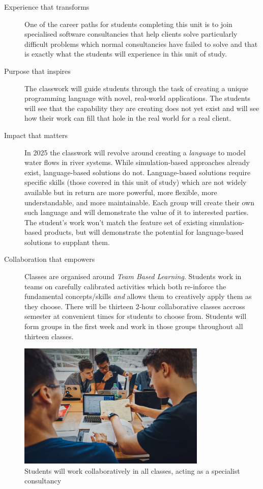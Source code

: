 \documentclass[twoside=false,DIV=14]{scrartcl}
\begin{document}
\begin{description}
\item[Experience that transforms] One of the career paths for students completing this unit is to join specialised software consultancies that help clients solve particularly difficult problems which normal consultancies have failed to solve and that is exactly what the students will experience in this unit of study.
\item[Purpose that inspires] The classwork will guide students through the task of creating a unique programming language with novel, real-world applications.  The students will see that the capability they are creating does not yet exist and will see how their work can fill that hole in the real world for a real client.  
\item[Impact that matters] In 2025 the classwork will revolve around creating a \emph{language} to model water flows in river systems.  While simulation-based approaches already exist, language-based solutions do not.  Language-based solutions require specific skills (those covered in this unit of study) which are not widely available but in return are more powerful, more flexible, more understandable, and more maintainable.  Each group will create their own such language and will demonstrate the value of it to interested parties.  The student's work won't match the feature set of existing simulation-based products, but will demonstrate the potential for language-based solutions to supplant them.
\item[Collaboration that empowers] Classes are organised around \emph{Team Based Learning}.  Students work in teams on carefully calibrated activities which both re-inforce the fundamental concepts/skills \emph{and} allows them to creatively apply them as they choose.  There will be thirteen 2-hour collaborative classes accross semester at convenient times for students to choose from.  Students will form groups in the first week and work in those groups throughout all thirteen classes.
\end{description}

\begin{figure}[h]
    \begin{center}
    \includegraphics[width=0.8\textwidth]{tbl.jpg}
\end{center}
\caption{Students will work collaboratively in all classes, acting as a specialist consultancy}
\end{figure}
\end{document}

